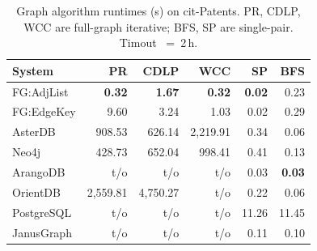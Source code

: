 \begin{table}[h!]
  \centering
  \footnotesize
  \setlength{\tabcolsep}{2pt}
  \begin{tabular*}{\columnwidth}{@{\extracolsep{\fill}}lrrrrr@{}}
    \toprule
    System & PR & CDLP & WCC & SP & BFS \\
    \midrule
    FG:AdjList & \textbf{0.32} & \textbf{1.67} & \textbf{0.32} & \textbf{0.02} & 0.23 \\
    FG:EdgeKey & 9.60 & 3.24 & 1.03 & 0.02 & 0.29 \\
    AsterDB & 908.53 & 626.14 & 2{,}219.91 & 0.34 & 0.06 \\
    Neo4j & 428.73 & 652.04 & 998.41 & 0.41 & 0.13 \\
    ArangoDB & t/o & t/o & t/o & 0.03 & \textbf{0.03} \\
    OrientDB & 2{,}559.81 & 4{,}750.27 & t/o & 0.22 & 0.06 \\
    PostgreSQL & t/o & t/o & t/o & 11.26 & 11.45 \\
    JanusGraph & t/o & t/o & t/o & 0.11 & 0.10 \\
    \bottomrule
  \end{tabular*}
  \caption{Graph algorithm runtimes (s) on cit-Patents. PR, CDLP, WCC are full-graph iterative; BFS, SP are single-pair. Timout ~=~2\,h.}
  \label{tab:graph-algorithms}
\end{table}



